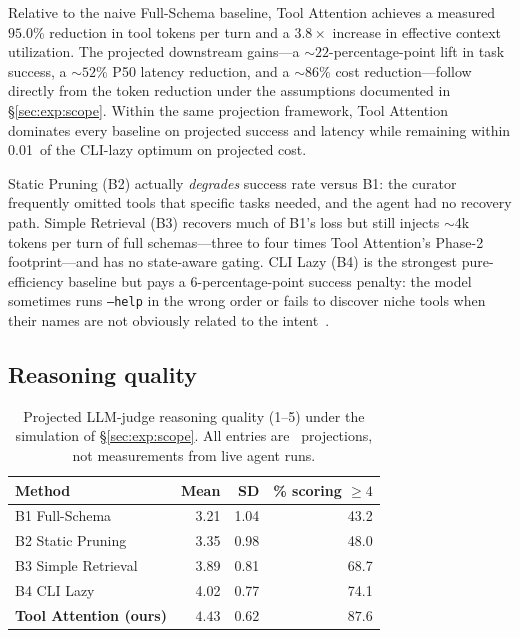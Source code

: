 \documentclass[11pt]{article}
\newcommand{\toprule}{\hline\hline}
\newcommand{\midrule}{\hline}
\newcommand{\bottomrule}{\hline\hline}
\begin{document}
Relative to the naive Full-Schema baseline, Tool Attention achieves a measured $95.0\%$ reduction in tool tokens per turn and a $3.8\times$ increase in effective context utilization. The projected downstream gains---a ${\sim}22$-percentage-point lift in task success, a ${\sim}52\%$ P50 latency reduction, and a ${\sim}86\%$ cost reduction---follow directly from the token reduction under the assumptions documented in \S\ref{sec:exp:scope}. Within the same projection framework, Tool Attention dominates every baseline on projected success and latency while remaining within 0.01\textcent\ of the CLI-lazy optimum on projected cost.

Static Pruning (B2) actually \emph{degrades} success rate versus B1: the curator frequently omitted tools that specific tasks needed, and the agent had no recovery path. Simple Retrieval (B3) recovers much of B1's loss but still injects $\sim$4k tokens per turn of full schemas---three to four times Tool Attention's Phase-2 footprint---and has no state-aware gating. CLI Lazy (B4) is the strongest pure-efficiency baseline but pays a 6-percentage-point success penalty: the model sometimes runs \texttt{--help} in the wrong order or fails to discover niche tools when their names are not obviously related to the intent~\citep{pan2026agent}.

\subsection{Reasoning quality}

\begin{table}[t]
\centering
\caption{Projected LLM-judge reasoning quality (1--5) under the simulation of \S\ref{sec:exp:scope}. All entries are \dag\ projections, not measurements from live agent runs.}
\label{tab:quality}
\begin{tabular}{lrrr}
\toprule
\textbf{Method} & \textbf{Mean} & \textbf{SD} & \textbf{\% scoring $\ge 4$} \\
\midrule
B1 Full-Schema     & 3.21 & 1.04 & 43.2 \\
B2 Static Pruning  & 3.35 & 0.98 & 48.0 \\
B3 Simple Retrieval & 3.89 & 0.81 & 68.7 \\
B4 CLI Lazy        & 4.02 & 0.77 & 74.1 \\
\textbf{Tool Attention (ours)} & $\bm{4.43}$ & $\bm{0.62}$ & $\bm{87.6}$ \\
\bottomrule
\end{tabular}
\end{table}
\end{document}
